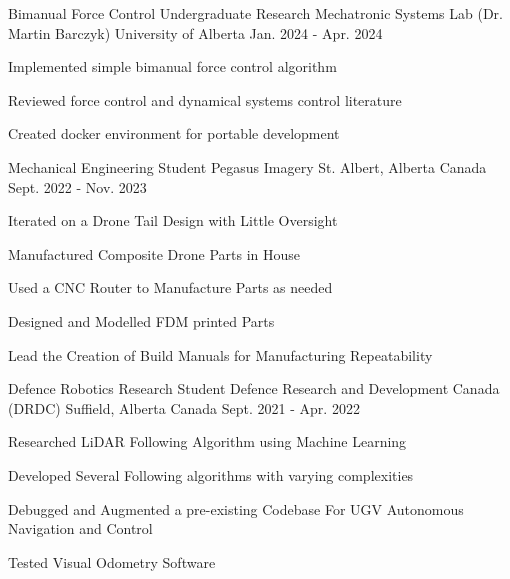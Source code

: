 

\begin{cventries}
  
\cventry
{Bimanual Force Control Undergraduate Research} %
{Mechatronic Systems Lab (Dr. Martin Barczyk)} %
{University of Alberta} %
{Jan. 2024 - Apr. 2024} %
{
  \begin{cvitems} %
    \item Implemented simple bimanual force control algorithm
    \item Reviewed force control and dynamical systems control literature
    \item Created docker environment for portable development
  \end{cvitems}
}

\cventry
{Mechanical Engineering Student} %
{Pegasus Imagery} %
{St. Albert, Alberta Canada} %
{Sept. 2022 - Nov. 2023} %
{
  \begin{cvitems} %
    \item Iterated on a Drone Tail Design with Little Oversight
    \item Manufactured Composite Drone Parts in House
    \item Used a CNC Router to Manufacture Parts as needed
    \item Designed and Modelled FDM printed Parts
    \item Lead the Creation of Build Manuals for Manufacturing Repeatability
  \end{cvitems}
  }
  
    \cventry
      {Defence Robotics Research Student} %
      {Defence Research and Development Canada (DRDC)} %
      {Suffield, Alberta Canada} %
      {Sept. 2021 - Apr. 2022} %
      {
        \begin{cvitems} %
          \item Researched LiDAR  Following Algorithm using Machine Learning
          \item Developed Several Following algorithms with varying complexities
          \item Debugged and Augmented a pre-existing Codebase For UGV Autonomous Navigation and Control
          \item Tested Visual Odometry Software
        \end{cvitems}
      }


\end{cventries}
